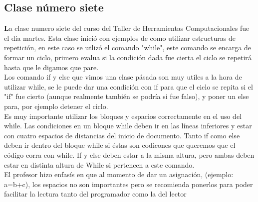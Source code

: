 \documentclass{book}
\begin{document}
\begin{enumerate}
\begin{enumerate}
\chapter{Clase número siete}
\textbf La clase numero siete del curso del Taller de Herramientas Computacionales fue el día martes.
Esta clase inició con ejemplos de como utilizar estructuras de repetición, en este caso se utlizó el comando "while", este comando se encarga de formar un ciclo, primero evalua si la condición dada fue cierta el ciclo se repetirá hasta que le digamos que pare. \\
Los comando if y else que vimos una clase pásada son muy utiles a la hora de utilizar while, se le puede dar una condición con if para que el ciclo se repita si el "if" fue cierto (aunque realmente también se podría si fue falso), y poner un else para, por ejemplo detener el ciclo. \\
Es muy importante utilizar los bloques y espacios correctamente en el uso del while. Las condiciones en un bloque while deben ir en las líneas inferiores y estar con cuatro espacios de distancias del inicio de documento. Tanto if como else deben ir dentro del bloque while si éstas son codicones que queremos que el código corra con while. If y else deben estar a la misma altura, pero ambas deben estar en distinta altura de While si pertencen a este comando. \\
El profesor hizo enfasís en que al momento de dar un asignación, (ejemplo: a=b+c), los espacios no son importantes pero se recomienda ponerlos para poder facilitar la lectura tanto del programador como la del lector\\


\end{enumerate}
\end{enumerate}
\end{document}

